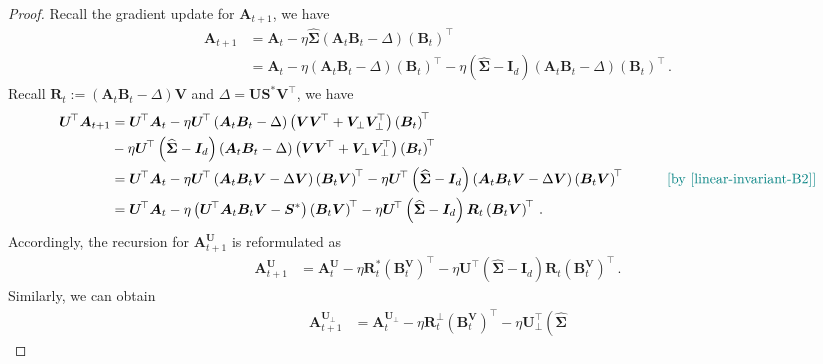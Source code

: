 \begin{proof}
    Recall the gradient update for $\bm A_{t+1}$, we have
    \begin{align*}
        \bm A_{t+1} & = \bm A_t - \eta \widehat{\bm \Sigma}\left(\bm A_t \bm B_t - \Delta\right)\left(\bm B_t\right)^{\!\top}\\
        & = \bm A_t - \eta \left(\bm A_t \bm B_t - \Delta\right)\left(\bm B_t\right)^{\!\top} - \eta \left(\widehat{\bm \Sigma}-\bm I_d\right)\left(\bm A_t \bm B_t - \Delta\right)\left(\bm B_t\right)^{\!\top}\,.
    \end{align*}
   Recall $\bm R_t := (\bm A_t \bm B_t - \Delta)\bm V$ and $\Delta = \bm U \bm S^* \bm V^{\!\top}$, we have
    \begin{align*}
        \bm U^{\!\top}\bm A_{t+1} & = \bm U^{\!\top}\bm A_t - \eta \bm U^{\!\top}\left(\bm A_t \bm B_t - \Delta\right)\left(\bm V\bm V^{\!\top}+\bm V_\perp \bm V_\perp^{\!\top}\right)\left(\bm B_t\right)^{\!\top}\\
        &- \eta \bm U^{\!\top}\left(\widehat{\bm \Sigma}-\bm I_d\right)\left(\bm A_t \bm B_t - \Delta\right)\left(\bm V\bm V^{\!\top}+\bm V_\perp \bm V_\perp^{\!\top}\right)\left(\bm B_t\right)^{\!\top}\\
        & = \bm U^{\!\top}\bm A_t - \eta \bm U^{\!\top}\left(\bm A_t \bm B_t\bm V - \Delta\bm V\right)\left(\bm B_t\bm V\right)^{\!\top} - \eta \bm U^{\!\top}\left(\widehat{\bm \Sigma}
        - \bm I_d\right)\left(\bm A_t \bm B_t\bm V - \Delta\bm V\right)\left(\bm B_t\bm V\right)^{\!\top}\quad \tag*{\color{teal}[by \cref{linear-invariant-B2}]}\\
        & = \bm U^{\!\top}\bm A_t - \eta \left(\bm U^{\!\top}\bm A_t \bm B_t\bm V - \bm S^*\right)\left(\bm B_t\bm V\right)^{\!\top}
         - \eta \bm U^{\!\top}\left(\widehat{\bm \Sigma}
        - \bm I_d\right)\bm R_t \left(\bm B_t\bm V\right)^{\!\top}\,.
    \end{align*} 
   Accordingly, the recursion for $\bm A^{\bm U}_{t+1}$ is reformulated as
    \begin{align*}
        \bm A^{\bm U}_{t+1} & = \bm A^{\bm U}_t - \eta \bm R^*_t \left(\bm B_t^{\bm V}\right)^{\!\top} - \eta \bm U^{\!\top}\left(\widehat{\bm \Sigma}
        - \bm I_d\right) \bm R_t \left(\bm B_t^{\bm V}\right)^{\!\top}\,.
    \end{align*}
    Similarly, we can obtain
    \begin{align*}
        \bm A^{\bm U_\perp}_{t+1} & = \bm A^{\bm U_\perp}_t - \eta \bm R^\perp_t \left(\bm B_t^{\bm V}\right)^{\!\top} - \eta \bm U^{\!\top}_\perp\left(\widehat{\bm \Sigma}

\end{align*}
\end{proof}
